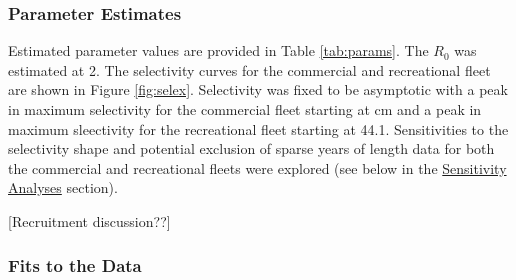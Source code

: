 \documentclass[11pt,
  english,
  a4paper,
]{article}
\begin{document}
\leavevmode\tagmcend\tagstructend\par


\hypertarget{parameter-estimates}{%
\subsubsection{Parameter Estimates}\label{parameter-estimates}}

\leavevmode\tagmcend\tagstructend


Estimated parameter values are provided in Table \ref{tab:params}. The {\(R_0\)\leavevmode\tagmcend\tagstructend} was estimated at 2. The selectivity curves for the commercial and recreational fleet are shown in Figure \ref{fig:selex}. Selectivity was fixed to be asymptotic with a peak in maximum selectivity for the commercial fleet starting at cm and a peak in maximum sleectivity for the recreational fleet starting at 44.1. Sensitivities to the selectivity shape and potential exclusion of sparse years of length data for both the commercial and recreational fleets were explored (see below in the {\protect\hyperlink{sensitivity-analyses}{Sensitivity Analyses}\leavevmode\tagmcend\tagstructend} section).

\leavevmode\tagmcend\tagstructend\par


{[}Recruitment discussion??{]}

\leavevmode\tagmcend\tagstructend\par


\hypertarget{fits-to-the-data}{%
\subsubsection{Fits to the Data}\label{fits-to-the-data}}

\leavevmode\tagmcend\tagstructend

\end{document}
